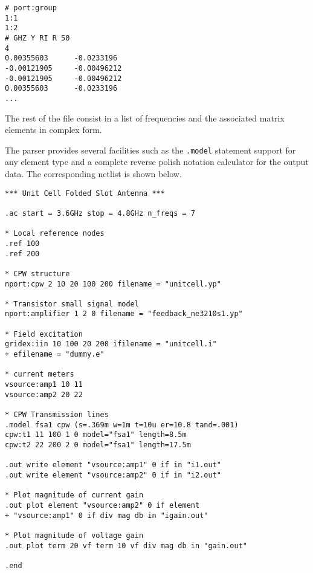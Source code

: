 \begin{verbatim}
# port:group
1:1
1:2
# GHZ Y RI R 50
4
0.00355603      -0.0233196
-0.00121905     -0.00496212
-0.00121905     -0.00496212
0.00355603      -0.0233196
...
\end{verbatim}

The rest of the file consist in a list of frequencies and the
associated matrix elements in complex form.

The parser provides several facilities such as the {\tt .model}
statement support for any element type and a complete reverse polish
notation calculator for the output data. The corresponding netlist is
shown below.

{
\begin{verbatim}
*** Unit Cell Folded Slot Antenna ***

.ac start = 3.6GHz stop = 4.8GHz n_freqs = 7

* Local reference nodes
.ref 100
.ref 200

* CPW structure
nport:cpw_2 10 20 100 200 filename = "unitcell.yp"

* Transistor small signal model
nport:amplifier 1 2 0 filename = "feedback_ne3210s1.yp"

* Field excitation
gridex:iin 10 100 20 200 ifilename = "unitcell.i"
+ efilename = "dummy.e"

* current meters
vsource:amp1 10 11
vsource:amp2 20 22

* CPW Transmission lines
.model fsa1 cpw (s=.369m w=1m t=10u er=10.8 tand=.001)
cpw:t1 11 100 1 0 model="fsa1" length=8.5m
cpw:t2 22 200 2 0 model="fsa1" length=17.5m

.out write element "vsource:amp1" 0 if in "i1.out"
.out write element "vsource:amp2" 0 if in "i2.out"

* Plot magnitude of current gain
.out plot element "vsource:amp2" 0 if element
+ "vsource:amp1" 0 if div mag db in "igain.out"

* Plot magnitude of voltage gain
.out plot term 20 vf term 10 vf div mag db in "gain.out"

.end
\end{verbatim}}

